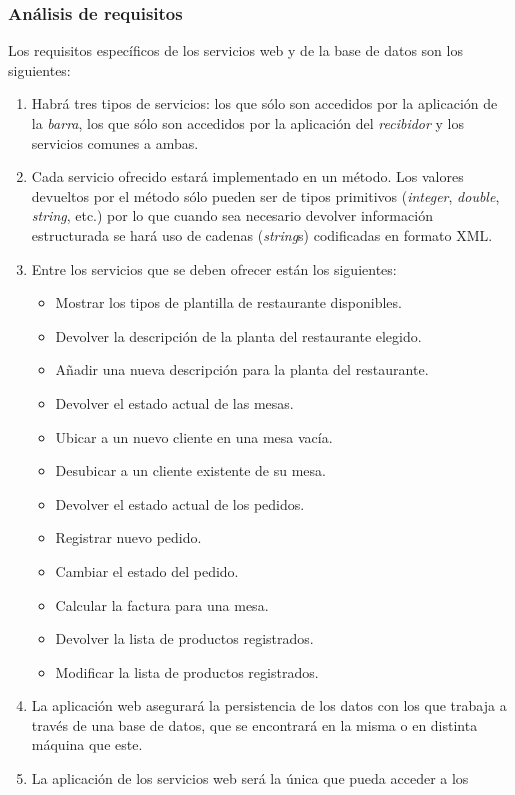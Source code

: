 \subsubsection{Análisis de requisitos}
Los requisitos específicos de los servicios web y de la base de datos son
los siguientes:
\begin{enumerate}
\item Habrá tres tipos de servicios: los que sólo son accedidos por la
aplicación de la \emph{barra}, los que sólo son accedidos por la aplicación
del \emph{recibidor} y los servicios comunes a ambas.
\item Cada servicio ofrecido estará implementado en un método. Los valores
devueltos por el método sólo pueden ser de tipos primitivos (\emph{integer},
\emph{double}, \emph{string}, etc.) por lo que cuando sea necesario devolver
información estructurada se hará uso de cadenas (\emph{string}s) codificadas
en formato \acs{XML}.
\item Entre los servicios que se deben ofrecer están los siguientes:
  \begin{itemize}
  \item Mostrar los tipos de plantilla de restaurante disponibles.
  \item Devolver la descripción de la planta del restaurante elegido.
  \item Añadir una nueva descripción para la planta del restaurante.
  \item Devolver el estado actual de las mesas.
  \item Ubicar a un nuevo cliente en una mesa vacía.
  \item Desubicar a un cliente existente de su mesa.
  \item Devolver el estado actual de los pedidos.
  \item Registrar nuevo pedido.
  \item Cambiar el estado del pedido.
  \item Calcular la factura para una mesa.
  \item Devolver la lista de productos registrados.
  \item Modificar la lista de productos registrados.
  \end{itemize}
\item La aplicación web asegurará la persistencia de los datos con
los que trabaja a través de una base de datos, que se encontrará en la misma
o en distinta máquina que este.
\item La aplicación de los servicios web será la única que pueda acceder a los

\end{enumerate}
